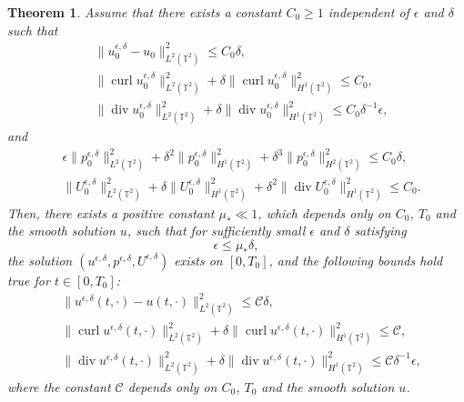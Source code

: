 \documentclass[reqno,10pt]{amsart}
\newtheorem{theorem}{Theorem}[section]
\theoremstyle{definition}
\theoremstyle{remark}
\numberwithin{equation}{section}
\DeclareMathOperator{\dive}{div}
\DeclareMathOperator{\curl}{curl}
\begin{document}
\begin{theorem} \label{thm:critical_2d}
Assume that there exists a constant $C_0\ge 1$ independent of $\epsilon$ and $\delta$ such that
\begin{subequations}
\begin{align}
    &\| u_0^{\epsilon,\delta}-u_0 \|_{L^2(\mathbb T^2)}^2 \le C_0\delta, \\
    &\|\curl u^{\epsilon,\delta}_0\|_{L^2(\mathbb T^2)}^2 + \delta \| \curl u^{\epsilon,\delta}_0 \|_{H^1(\mathbb T^2)}^2 \le C_0, \\
    &\|\dive u^{\epsilon,\delta}_0\|_{L^2(\mathbb T^2)}^2 + \delta \| \dive u^{\epsilon,\delta}_0 \|_{H^1(\mathbb T^2)}^2 \le C_0\delta^{-1}\epsilon,
\end{align}
\end{subequations}
and
\begin{subequations}
\begin{align}
    &\epsilon \|p^{\epsilon,\delta}_0\|_{L^2(\mathbb T^2)}^2 + \delta^2 \|p_0^{\epsilon,\delta}\|_{H^1(\mathbb T^2)}^2 + \delta^3 \|p_0^{\epsilon,\delta}\|_{H^2(\mathbb T^2)}^2 \le C_0\delta, \\ 
    &\|U^{\epsilon,\delta}_0\|_{L^2(\mathbb T^2)}^2 + \delta \| U^{\epsilon,\delta}_0 \|_{H^1(\mathbb T^2)}^2 + \delta^2 \|\dive U^{\epsilon,\delta}_0 \|_{H^1(\mathbb T^2)}^2 \le C_0.
\end{align}
\end{subequations}
Then, there exists a positive constant $\mu_*\ll 1$, which depends only on $C_0$, $T_0$ and the smooth solution $u$, such that for sufficiently small $\epsilon$ and $\delta$ satisfying
\begin{equation} \label{eq:relation_2d}
    \epsilon \le \mu_* \delta,
\end{equation}
the solution $(u^{\epsilon,\delta},p^{\epsilon,\delta},U^{\epsilon,\delta})$ exists on $[0,T_0]$, and the following bounds hold true for $t\in[0,T_0]$:
\begin{subequations} \label{eq:bounds_critcoro_2d}
\begin{align}
    &\|u^{\epsilon,\delta}(t,\cdot)-u(t,\cdot)\|_{L^2(\mathbb T^2)}^2\le \mathcal C\delta, \label{eq:bounds_crit2d_u} \\
    &\|\curl u^{\epsilon,\delta}(t,\cdot)\|_{L^2(\mathbb T^2)}^2 + \delta \|\curl u^{\epsilon,\delta}(t,\cdot)\|_{H^1(\mathbb T^2)}^2 \le \mathcal C, \label{eq:bounds_crit2d_curl} \\
    &\|\dive u^{\epsilon,\delta}(t,\cdot)\|_{L^2(\mathbb T^2)}^2 + \delta \|\dive u^{\epsilon,\delta}(t,\cdot)\|_{H^1(\mathbb T^2)}^2 \le \mathcal C\delta^{-1}\epsilon, \label{eq:bounds_crit2d_div}
\end{align}
\end{subequations}
where the constant $\mathcal C$ depends only on $C_0$, $T_0$ and the smooth solution $u$.
\end{theorem}
\end{document}
